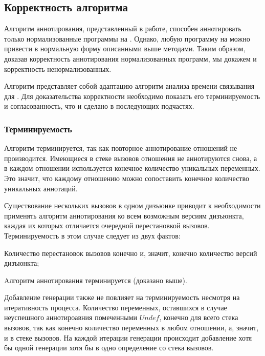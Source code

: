 \subsection{Корректность алгоритма}

Алгоритм аннотирования, представленный в работе, способен аннотировать только нормализованные программы на \miniKanren{}.
Однако, любую программу на \miniKanren{} можно привести в нормальную форму описанными выше методами.
Таким образом, доказав корректность аннотирования нормализованных программ, мы докажем и корректность ненормализованных.

Алгоритм представляет собой адаптацию алгоритм анализа времени связывания для \miniKanren{}.
Для доказательства корректности необходимо показать его терминируемость и согласованность, что и сделано в последующих подчастях.


\subsubsection{Терминируемость}

Алгоритм терминируется, так как повторное аннотирование отношений не производится.
Имеющиеся в стеке вызовов отношения не аннотируются снова, а в каждом отношении используется конечное количество уникальных переменных.
Это значит, что каждому отношению можно сопоставить конечное количество уникальных аннотаций.

Существование нескольких вызовов в одном дизъюнке приводит к необходимости применять алгоритм аннотирования ко всем возможным версиям дизъюнкта, каждая их которых отличается очередной перестановкой вызовов.
Терминируемость в этом случае следует из двух фактов:
\begin{itermize}
    \item Количество перестановок вызовов конечно и, значит, конечно количество версий дизъюнкта;
    \item Aлгоритм аннотирования терминируется (доказано выше).
\end{itermize}

Добавление генерации также не повлияет на терминируемость несмотря на итеративность процесса.
Количество переменных, оставшихся в случае неуспешного аннотироавния помеченными $Undef$, конечно для всего стека вызовов, так как конечно количество переменных в любом отношении, а, значит, и в стеке вызовов.
На каждой итерации генерации происходит добавление хотя бы одной генерации хотя бы в одно определение со стека вызовов.

